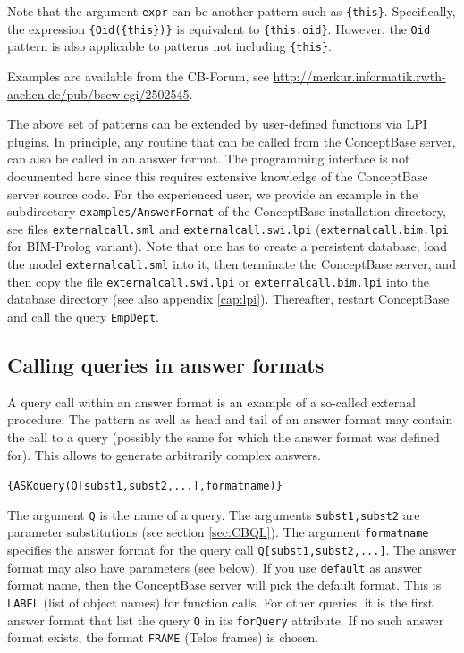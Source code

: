 Note that the argument {\tt expr} can be another pattern such as \verb+{this}+. Specifically, the expression
\verb+{Oid({this})}+ is equivalent to \verb+{this.oid}+. However, the {\tt Oid} pattern is
also applicable to patterns not including \verb+{this}+.

Examples are available from the CB-Forum, see \url{http://merkur.informatik.rwth-aachen.de/pub/bscw.cgi/2502545}.

The above set of patterns can be extended by user-defined functions via LPI plugins.
In principle, any routine that can be called from
the ConceptBase server, can also be called in an answer format. 
The programming interface is not documented here since this requires
extensive knowledge of the ConceptBase server source code. 
For the experienced user, we provide an example in  the 
subdirectory {\tt examples/AnswerFormat} of the ConceptBase installation
directory, see files {\tt externalcall.sml} and
{\tt externalcall.swi.lpi} ({\tt externalcall.bim.lpi} for BIM-Prolog variant). 
Note that one has to create a persistent database, load the model {\tt externalcall.sml} into it, then terminate
the ConceptBase server, and then copy the file {\tt externalcall.swi.lpi} or {\tt externalcall.bim.lpi} 
into the database directory (see also appendix \ref{cap:lpi}). 
Thereafter, restart ConceptBase and call the query {\tt EmpDept}.


\subsection{Calling queries in answer formats}
\label{subsec:askquery}

A query call within an answer format is an example of a so-called external procedure.
The pattern as well as head and tail of an answer format may contain the call to a query (possibly the same for which the answer format was
defined for). This allows to generate arbitrarily complex answers.

\verb+{ASKquery(Q[subst1,subst2,...],formatname)}+

The argument {\tt Q} is the name of a query. The arguments {\tt subst1,subst2} are parameter substitutions (see section \ref{sec:CBQL}). The argument
{\tt formatname} specifies the answer format for the query call {\tt Q[subst1,subst2,...]}. The answer format may also have parameters (see below).
If you use {\tt default} as answer format name, then the ConceptBase server will pick the default format. This is {\tt LABEL} (list of object names) for
function calls.
For other queries, it is the first answer format that list the query {\tt Q} in its {\tt forQuery} attribute. If no such answer format exists,
the format {\tt FRAME} (Telos frames) is chosen.


